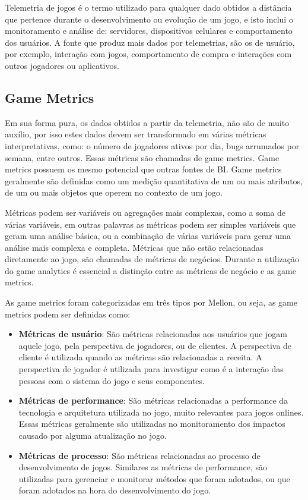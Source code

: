 Telemetria de jogos é o termo utilizado para qualquer dado obtidos a distância que pertence durante o desenvolvimento ou evolução de um jogo, e isto inclui o monitoramento e análise de: servidores, dispositivos celulares e comportamento dos usuários. A fonte que produz mais dados por telemetrias, são os de usuário, por exemplo, interação com jogos, comportamento de compra e interações com outros jogadores ou aplicativos\cite{telemetry}.
\subsection{Game Metrics}
Em sua forma pura, os dados obtidos a partir da telemetria, não são de muito auxílio, por isso estes dados devem ser transformado em várias métricas interpretativas, como: o número de jogadores ativos por dia, bugs arrumados por semana, entre outros. Essas métricas são chamadas de game metrics. Game metrics possuem os mesmo potencial que outras fontes de BI. Game metrics geralmente são definidas como um medição quantitativa de um ou mais atributos, de um ou mais objetos que operem no contexto de um jogo.

Métricas podem ser variáveis ou  agregações mais complexas, como a soma de várias variáveis, em outras palavras as métricas podem ser simples variáveis que geram uma análise básica, ou a combinação de várias variáveis para gerar uma análise mais complexa e completa. Métricas que não estão relacionadas diretamente ao jogo, são chamadas de métricas de negócios. Durante a utilização do game analytics é essencial a distinção entre as métricas de negócio e as game metrics.

As game metrics foram categorizadas em três tipos por Mellon\cite{game_metrics}, ou seja, as game metrics podem ser definidas como:
\begin{itemize}
	\item \textbf{Métricas de usuário}: São métricas relacionadas aos usuários que jogam aquele jogo, pela perspectiva de jogadores, ou de clientes. A perspectiva de cliente é utilizada quando as métricas são relacionadas a receita. A perspectiva de jogador é utilizada para investigar como é a interação das pessoas com o sistema do jogo e seus componentes.
	\item \textbf{Métricas de performance}: São métricas relacionadas a performance da tecnologia e arquitetura utilizada no jogo, muito relevantes para jogos onlines. Essas métricas geralmente são utilizadas no monitoramento dos impactos causado por alguma atualização no jogo.
	\item \textbf{Métricas de processo}: São métricas relacionadas ao processo de desenvolvimento de jogos. Similares as métricas de performance, são utilizadas para gerenciar e monitorar métodos que foram adotados, ou que foram adotados na hora do desenvolvimento do jogo. 
\end{itemize}
